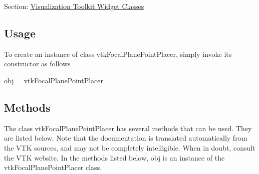 Section\-: \hyperlink{sec_vtkwidgets}{Visualization Toolkit Widget Classes} \hypertarget{vtkwidgets_vtkxyplotwidget_Usage}{}\subsection{Usage}\label{vtkwidgets_vtkxyplotwidget_Usage}
To create an instance of class vtk\-Focal\-Plane\-Point\-Placer, simply invoke its constructor as follows \begin{DoxyVerb}  obj = vtkFocalPlanePointPlacer
\end{DoxyVerb}
 \hypertarget{vtkwidgets_vtkxyplotwidget_Methods}{}\subsection{Methods}\label{vtkwidgets_vtkxyplotwidget_Methods}
The class vtk\-Focal\-Plane\-Point\-Placer has several methods that can be used. They are listed below. Note that the documentation is translated automatically from the V\-T\-K sources, and may not be completely intelligible. When in doubt, consult the V\-T\-K website. In the methods listed below, {\ttfamily obj} is an instance of the vtk\-Focal\-Plane\-Point\-Placer class. 
